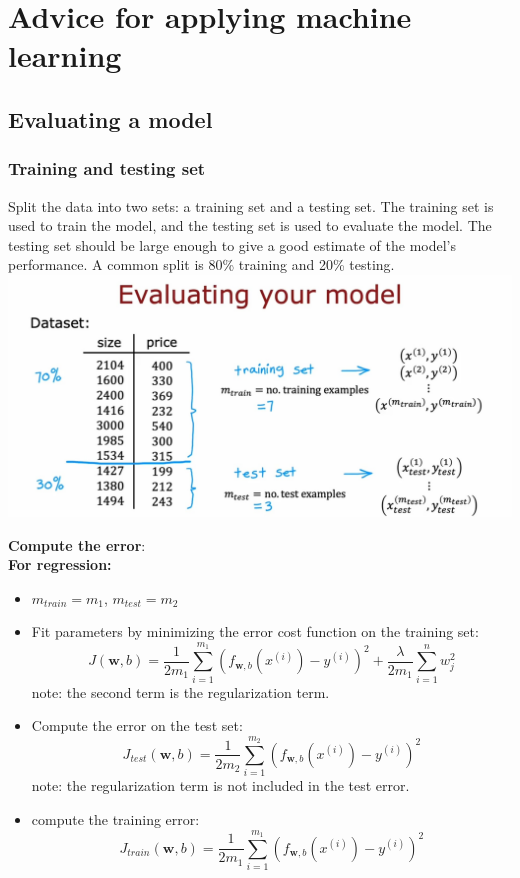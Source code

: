 \chapter{Advice for applying  machine learning}
\section{Evaluating a model}
\subsection*{Training and testing set}
Split the data into two sets: a training set and a testing set. The training set is used to train the model, 
and the testing set is used to evaluate the model. 
The testing set should be large enough to give a good estimate of the model's performance.
 A common split is 80\% training and 20\% testing.\\
\includegraphics*[width=\textwidth]{images/10.1}
\par
\noindent
{\large \textbf{Compute the error}:}\\
\textbf{For regression:}
\begin{itemize}
    \item $m_{train} = m_1$, $m_{test} = m_2$
    \item Fit parameters by minimizing the error cost function on the training set:
    \[ J(\mathbf{w}, b) = \frac{1}{2m_1} \sum_{i=1}^{m_1} (f_{\mathbf{w}, b}(x^{(i)}) - y^{(i)})^2 + 
    \frac{\lambda}{2m_1}\sum_{i=1}^{n}w_j^2\]
    note: the second term is the regularization term.
    \item Compute the error on the test set:
    \[ J_{test}(\mathbf{w}, b) = \frac{1}{2m_2} \sum_{i=1}^{m_2} \left(f_{\mathbf{w}, b}(x^{(i)}) - y^{(i)}\right)^2 \]
    note: the regularization term is not included in the test error.
    \item compute the training error:
    \[ J_{train}(\mathbf{w}, b) = \frac{1}{2m_1} \sum_{i=1}^{m_1} \left(f_{\mathbf{w}, b}(x^{(i)}) - y^{(i)}\right)^2 \]
\end{itemize}
